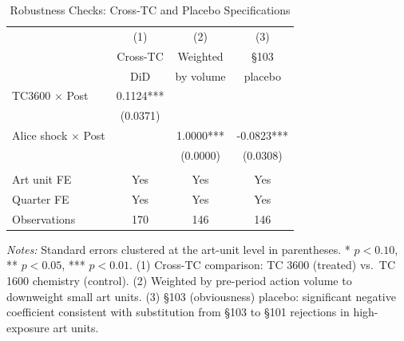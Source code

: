 \begin{table}[H]
\centering
\caption{Robustness Checks: Cross-TC and Placebo Specifications}
\label{tab:robustness}
\begin{threeparttable}
\begin{tabular}{lccc}
\toprule
 & (1) & (2) & (3) \\
 & Cross-TC & Weighted & \S103 \\
 & DiD & by volume & placebo \\
\midrule
TC3600 $\times$ Post & 0.1124*** & & \\
 & (0.0371) & & \\
Alice shock $\times$ Post & & 1.0000*** & -0.0823*** \\
 & & (0.0000) & (0.0308) \\
\\
Art unit FE & Yes & Yes & Yes \\
Quarter FE & Yes & Yes & Yes \\
Observations & 170 & 146 & 146 \\
\bottomrule
\end{tabular}
\begin{tablenotes}[flushleft]
\small
\item \textit{Notes:} Standard errors clustered at the art-unit level in parentheses. * $p<0.10$, ** $p<0.05$, *** $p<0.01$. (1) Cross-TC comparison: TC 3600 (treated) vs.\ TC 1600 chemistry (control). (2) Weighted by pre-period action volume to downweight small art units. (3) \S103 (obviousness) placebo: significant negative coefficient consistent with substitution from \S103 to \S101 rejections in high-exposure art units.
\end{tablenotes}
\end{threeparttable}
\end{table}
